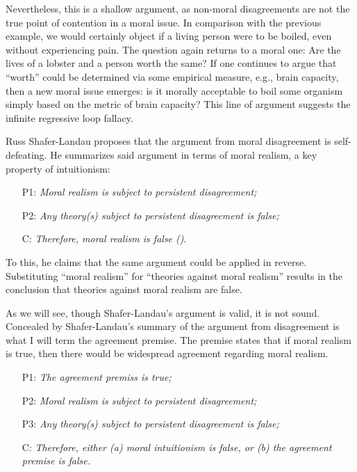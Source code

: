 Nevertheless, this is a shallow argument, as non-moral disagreements are not the true point of contention in a moral issue. In comparison with the previous example, we would certainly object if a living person were to be boiled, even without experiencing pain. The question again returns to a moral one: Are the lives of a lobster and a person worth the same? If one continues to argue that “worth” could be determined via some empirical measure, e.g., brain capacity, then a new moral issue emerges: is it morally acceptable to boil some organism simply based on the metric of brain capacity? This line of argument suggests the infinite regressive loop fallacy.  

Russ Shafer-Landau proposes that the argument from moral disagreement is self-defeating. He summarizes said argument in terms of moral realism, a key property of intuitionism: 
\begin{enumerate}
	\item[P1:] \textit{Moral realism is subject to persistent disagreement;}

	\item[P2:] \textit{Any theory(s) subject to persistent disagreement is false;}

	\item[C:] \textit{Therefore, moral realism is false (\cite[pp.\ 44–48]{shaferlandau2004good})}.
\end{enumerate}

To this, he claims that the same argument could be applied in reverse. Substituting “moral realism” for “theories against moral realism” results in the conclusion that theories against moral realism are false. 

As we will see, though Shafer-Landau’s argument is valid, it is not sound. Concealed by Shafer-Landau’s summary of the argument from disagreement is what I will term the agreement premise. The premise states that if moral realism is true, then there would be widespread agreement regarding moral realism. 

\begin{enumerate}

	\item[P1:] \textit{The agreement premiss is true;}

	\item[P2:] \textit{Moral realism is subject to persistent disagreement;}

	\item[P3:] \textit{Any theory(s) subject to persistent disagreement is false;}

	\item[C:] \textit{Therefore, either (a) moral intuitionism is false, or (b) the agreement premise is false.}

\end{enumerate}

